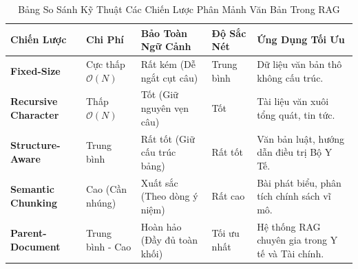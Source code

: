 \documentclass[12pt,a4paper]{report}
\begin{document}
\begin{table}[H]
\centering
\small
\renewcommand{\arraystretch}{1.2}
\caption{Bảng So Sánh Kỹ Thuật Các Chiến Lược Phân Mảnh Văn Bản Trong RAG}
\label{tab:chunking_strategies_ch5}
\begin{tabularx}{\textwidth}{>{\RaggedRight\arraybackslash\bfseries}p{2.6cm} >{\RaggedRight\arraybackslash}p{2.2cm} >{\RaggedRight\arraybackslash}p{2.2cm} >{\RaggedRight\arraybackslash}p{2.2cm} Y}
\toprule
\textbf{Chiến Lược} & \textbf{Chi Phí} & \textbf{Bảo Toàn Ngữ Cảnh} & \textbf{Độ Sắc Nét} & \textbf{Ứng Dụng Tối Ưu} \\
\midrule
Fixed-Size & Cực thấp $\mathcal{O}(N)$ & Rất kém (Dễ ngắt cụt câu) & Trung bình & Dữ liệu văn bản thô không cấu trúc. \\
Recursive Character & Thấp $\mathcal{O}(N)$ & Tốt (Giữ nguyên vẹn câu) & Tốt & Tài liệu văn xuôi tổng quát, tin tức. \\
Structure-Aware & Trung bình & Rất tốt (Giữ cấu trúc bảng) & Rất tốt & Văn bản luật, hướng dẫn điều trị Bộ Y Tế. \\
Semantic Chunking & Cao (Cần nhúng) & Xuất sắc (Theo dòng ý niệm) & Rất cao & Bài phát biểu, phân tích chính sách vĩ mô. \\
Parent-Document & Trung bình - Cao & Hoàn hảo (Đầy đủ toàn khối) & Tối ưu nhất & Hệ thống RAG chuyên gia trong Y tế và Tài chính. \\
\bottomrule
\end{tabularx}
\end{table}
\end{document}
